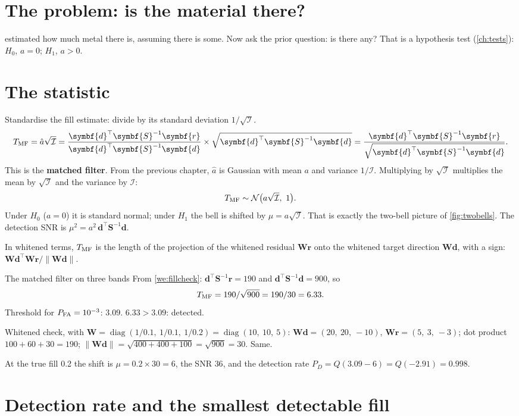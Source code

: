 \documentclass[11pt,a4paper,oneside,openany]{book}
\newcommand{\B}[1]{{\symbf{#1}}}
\newcommand{\B}[1]{{\bm{#1}}}
\newcommand{\T}{^{\top}}
\newcommand{\nrm}[1]{\lVert #1\rVert}
\newcommand{\vr}{\B{r}}
\newcommand{\vd}{\B{d}}
\newcommand{\mS}{\B{S}}
\newcommand{\mW}{\B{W}}
\newcommand{\ahat}{\hat a}
\begin{document}
\section{The problem: is the material there?}

 estimated how much metal there is, assuming there is some. Now ask the prior question: is there any? That is a hypothesis
test (\cref{ch:tests}): $H_0$, $a=0$; $H_1$, $a>0$.

\section{The statistic}

Standardise the fill estimate: divide by its standard deviation $1/\sqrt{\mathcal I}$.
\[
  T_{\rm MF}=\ahat\sqrt{\mathcal I}=\frac{\vd\T\mS^{-1}\vr}{\vd\T\mS^{-1}\vd}\times\sqrt{\vd\T\mS^{-1}\vd}=\frac{\vd\T\mS^{-1}\vr}{\sqrt{\vd\T\mS^{-1}\vd}} .
\]
This is the \textbf{matched filter}. From the previous chapter, $\ahat$ is Gaussian with mean $a$ and variance $1/\mathcal I$. Multiplying by
$\sqrt{\mathcal I}$ multiplies the mean by $\sqrt{\mathcal I}$ and the variance by $\mathcal I$:
\[
  T_{\rm MF}\sim\mathcal N\big(a\sqrt{\mathcal I},\ 1\big).
\]
Under $H_0$ ($a=0$) it is standard normal; under $H_1$ the bell is shifted by $\mu=a\sqrt{\mathcal I}$. That is exactly the two-bell picture
of \cref{fig:twobells}. The detection SNR is $\mu^2=a^2\,\vd\T\mS^{-1}\vd$.

In whitened terms, $T_{\rm MF}$ is the length of the projection of the whitened residual $\mW\vr$ onto the whitened target direction
$\mW\vd$, with a sign: $\mW\vd\T\mW\vr/\nrm{\mW\vd}$.

\begin{worked}[label=we:mf]{The matched filter on three bands}
From \cref{we:fillcheck}: $\vd\T\mS^{-1}\vr=190$ and $\vd\T\mS^{-1}\vd=900$, so
\[
  T_{\rm MF}=190/\sqrt{900}=190/30=6.33 .
\]
Threshold for $P_{\rm FA}=10^{-3}$: $3.09$. $6.33>3.09$: detected.

Whitened check, with $\mW=\operatorname{diag}(1/0.1,\ 1/0.1,\ 1/0.2)=\operatorname{diag}(10,\ 10,\ 5)$: $\mW\vd=(20,\ 20,\ -10)$, $\mW\vr=(5,\ 3,\ -3)$;
dot product $100+60+30=190$; $\nrm{\mW\vd}=\sqrt{400+400+100}=\sqrt{900}=30$. Same.

At the true fill 0.2 the shift is $\mu=0.2\times30=6$, the SNR $36$, and the detection rate $P_D=Q(3.09-6)=Q(-2.91)=0.998$.
\end{worked}

\section{Detection rate and the smallest detectable fill}
\end{document}
